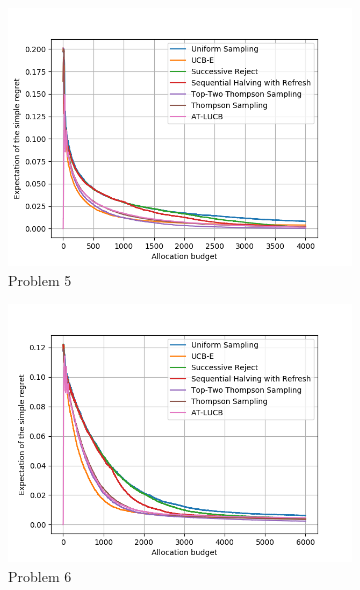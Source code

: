 \begin{figure}[ht]
\begin{subfigure}[t]{0.25\textwidth}
    \centering\includegraphics[width=\textwidth]{Chapter6/img/bai/setting5.png}
    \caption{Problem 5}
  \end{subfigure}
  \begin{subfigure}[t]{0.25\textwidth}
    \centering\includegraphics[width=\textwidth]{Chapter6/img/bai/setting6.png}
    \caption{Problem 6}
  \end{subfigure}
  \begin{subfigure}[t]{0.25\textwidth}

\end{subfigure}
\end{figure}
